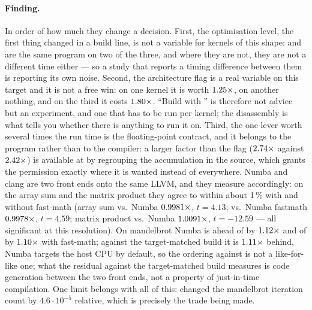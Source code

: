 \paragraph{Finding.} In order of how much they change a decision. First, the
optimisation level, the first thing changed in a build line, is not a variable for kernels of this shape:
 and  are the same program on two of the three, and where they are not, they
are not a different time either --- so a study that reports a timing difference between them is
reporting its own noise. Second, the architecture flag is a real variable on this target and it
is not a free win: on one kernel it is worth $\meas{ratio:b1_flags-314:mandelbrot/O2|b1_flags-314:mandelbrot/O3native}{1.25}\times$, on another nothing, and on the third
it costs $\meas{ratio:b1_flags-314:matmul/O3native|b1_flags-314:matmul/O2}{1.80}\times$. ``Build with '' is therefore not advice but an
experiment, and one that has to be run per kernel; the disassembly is what tells you whether
there is anything to run it on. Third, the one lever worth several times the run time is the
floating-point contract, and it belongs to the program rather than to the compiler: a larger
factor than the flag ($\meas{ratio:b1_flags-314:arraysum/accum_acc1|b1_flags-314:arraysum/accum_acc4}{2.74}\times$ against $\meas{ratio:b1_flags-314:arraysum/O3native|b1_flags-314:arraysum/O3native_ffast}{2.42}\times$) is available at  by regrouping
the accumulation in the source, which grants the permission exactly where it is wanted instead
of everywhere. Numba and clang are two front ends onto the same LLVM, and they measure
accordingly: on the array sum and the matrix product they agree to within about 1\,\%
with and without fast-math (array sum  vs.\ Numba $\meas{ratio:b1_flags-314:arraysum/numba_plain|b1_flags-314:arraysum/O2}{0.9981}\times$, $t=4.13$;
 vs.\ Numba fastmath $\meas{ratio:b1_flags-314:arraysum/numba_fastmath|b1_flags-314:arraysum/O3native_ffast}{0.9978}\times$, $t=4.59$; matrix product  vs.\
Numba $\meas{ratio:b1_flags-314:matmul/numba_plain|b1_flags-314:matmul/O2}{1.0091}\times$, $t=-12.59$ --- all significant at this resolution). On mandelbrot Numba is ahead of
\code{-O2} by $\meas{ratio:b1_flags-314:mandelbrot/O2|b1_flags-314:mandelbrot/numba_plain}{1.12}\times$ and of \code{-O3 -march=native -ffast-math} by $\meas{ratio:b1_flags-314:mandelbrot/O3native_ffast|b1_flags-314:mandelbrot/numba_fastmath}{1.10}\times$ with
fast-math; against the target-matched \code{-O3 -march=native} build it is $\meas{ratio:b1_flags-314:mandelbrot/numba_plain|b1_flags-314:mandelbrot/O3native}{1.11}\times$ behind,
Numba targets the host CPU by default, so the ordering against \code{-O2} is not a
like-for-like one; what the residual against the target-matched build measures is code
generation between the two front ends, not a property of just-in-time compilation. One limit belongs with all of this:  changed the
mandelbrot iteration count by $4.6\cdot10^{-5}$ relative, which is precisely the trade being
made.

